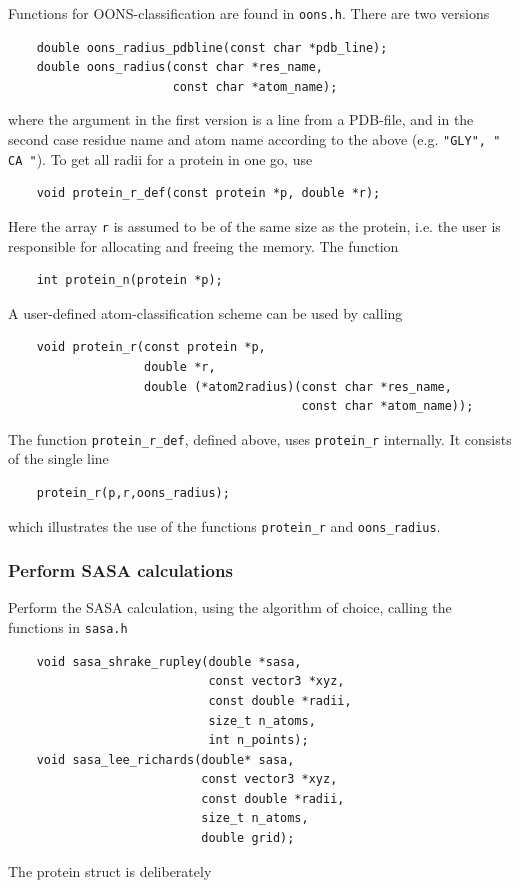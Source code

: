 \documentclass[a4paper,11pt]{article}
\begin{document}
Functions for OONS-classification are found in \texttt{oons.h}. There
are two versions
\begin{verbatim}
    double oons_radius_pdbline(const char *pdb_line);
    double oons_radius(const char *res_name,
                       const char *atom_name);
\end{verbatim}
where the argument in the first version is a line from a PDB-file, and
in the second case residue name and atom name according to the above
(e.g. \texttt{"GLY", " CA "}). To get all radii for a protein in one
go, use
\begin{verbatim}
    void protein_r_def(const protein *p, double *r);
\end{verbatim} 
Here the array \texttt{r} is assumed to be of the same size as the
protein, i.e. the user is responsible for allocating and freeing the
memory. The function
\begin{verbatim}
    int protein_n(protein *p);
\end{verbatim}
A user-defined atom-classification scheme can be used by calling 
\begin{verbatim}
    void protein_r(const protein *p, 
                   double *r,
                   double (*atom2radius)(const char *res_name, 
                                         const char *atom_name));
\end{verbatim}
The function \texttt{protein\_r\_def}, defined above, uses
\texttt{protein\_r} internally. It consists of the single line
\begin{verbatim}
    protein_r(p,r,oons_radius);
\end{verbatim}
which illustrates the use of the functions \texttt{protein\_r} and
\texttt{oons\_radius}.

\subsubsection{Perform SASA calculations}
Perform the SASA calculation, using the algorithm of choice, calling
the functions in \texttt{sasa.h}
\begin{verbatim}
    void sasa_shrake_rupley(double *sasa,
                            const vector3 *xyz,
                            const double *radii,
                            size_t n_atoms,
                            int n_points);
    void sasa_lee_richards(double* sasa,
                           const vector3 *xyz,
                           const double *radii,
                           size_t n_atoms,
                           double grid);

\end{verbatim}
The protein struct is deliberately
\end{document}
